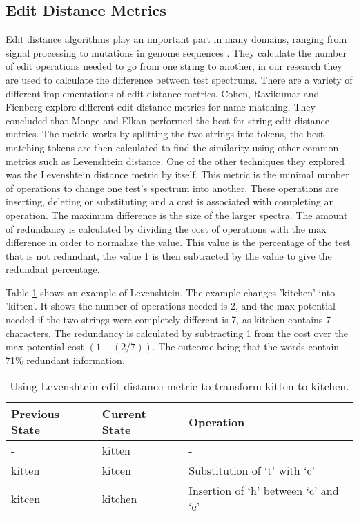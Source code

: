 \subsection{Edit Distance Metrics}
\label{editdistbg}
Edit distance algorithms play an important part in many domains, ranging from signal processing to mutations in genome sequences \cite{navarro2001guided}. They calculate the number of edit operations needed to go from one string to another, in our research they are used to calculate the difference between test spectrums. There are a variety of different implementations of edit distance metrics. Cohen, Ravikumar and Fienberg \cite{cohen2003comparison} explore different edit distance metrics for name matching. They concluded that Monge and Elkan \cite{monge1997efficient} performed the best for string edit-distance metrics. The metric works by splitting the two strings into tokens, the best matching tokens are then calculated to find the similarity using other common metrics such as Levenshtein distance. One of the other techniques they explored was the Levenshtein distance \cite{levenshtein1966binary} metric by itself. This metric is the minimal number of operations to change one test's spectrum into another. These operations are inserting, deleting or substituting and a cost is associated with completing an operation. The maximum difference is the size of the larger spectra. The amount of redundancy is calculated by dividing the cost of operations with the max difference in order to normalize the value. This value is the percentage of the test that is not redundant, the value 1 is then subtracted by the value to give the redundant percentage.

Table \ref{levenTable} shows an example of Levenshtein. The example changes 'kitchen' into 'kitten'. It shows the number of operations needed is 2, and the max potential needed if the two strings were completely different is 7, as kitchen contains 7 characters. The redundancy is calculated by subtracting 1 from the cost over the max potential cost $(1 - (2/7)) $. The outcome being that the words contain 71\% redundant information. 

\begin{table}[H]
\centering

\begin{tabular}{|l|l|l|}
\hline
{\bf Previous State} & {\bf Current State} & {\bf Operation}                      \\ \hline
-                    & kitten              & -                                    \\ \hline
kitten               & kitcen              & Substitution of `t' with `c'         \\ \hline
kitcen               & kitchen             & Insertion of `h' between `c' and `e' \\ \hline
\end{tabular}
\caption{Using Levenshtein edit distance metric to transform kitten to kitchen.}
\label{levenTable}
\end{table}

